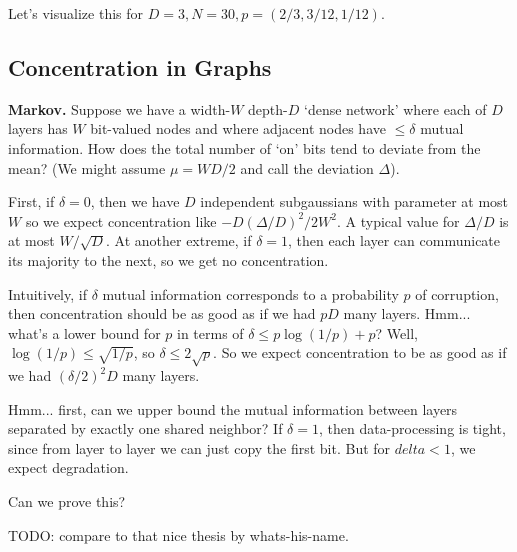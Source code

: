 \documentclass[12pt]{article}
\newcommand{\msec}[1]{\subsection*{\color{mblu}\textsf{#1}}}
\theoremstyle{definition}
\begin{document}
    Let's visualize this for $D=3, N=30, p=(2/3,3/12,1/12)$.


  \msec{Concentration in Graphs}

    \textbf{Markov.}
    Suppose we have a width-$W$ depth-$D$ `dense network' where each of $D$
    layers has $W$ bit-valued nodes and where adjacent nodes have $\leq \delta$
    mutual information.  How does the total number of `on' bits tend to deviate
    from the mean?  (We might assume $\mu=WD/2$ and call the deviation
    $\Delta$).

    First, if $\delta=0$, then we have $D$ independent subgaussians with
    parameter at most $W$ so we expect concentration like
    $-D(\Delta/D)^2/2W^2$.  A typical value for $\Delta/D$ is at most
    $W/\sqrt{D}$.  At another extreme, if $\delta=1$, then each layer can
    communicate its majority to the next, so we get no concentration.

    Intuitively, if $\delta$ mutual information corresponds to a probability
    $p$ of corruption, then concentration should be as good as if we had $pD$
    many layers.  Hmm... what's a lower bound for $p$ in terms of
    $\delta \leq p \log (1/p) + p$?  Well, $\log(1/p) \leq \sqrt{1/p}$,
    so $\delta \leq 2\sqrt{p}$.  So we expect concentration to be as good as
    if we had $(\delta/2)^2 D$ many layers.

    Hmm... first, can we upper bound the mutual information between layers
    separated by exactly one shared neighbor?  If $\delta=1$, then data-processing
    is tight, since from layer to layer we can just copy the first bit.
    But for $delta<1$, we expect degradation.

    Can we prove this?

    TODO: compare to that nice thesis by whats-his-name.

\end{document}
